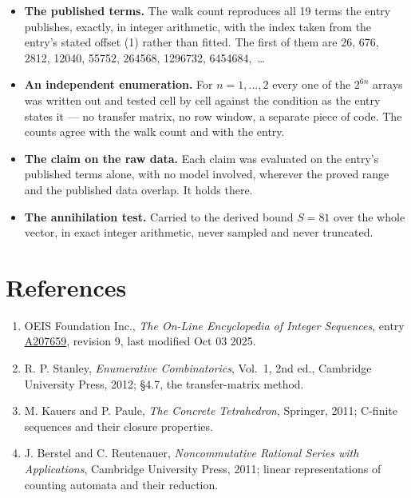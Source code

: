 \documentclass[11pt]{article}
\theoremstyle{definition}
\begin{document}
\begin{itemize}

\item {\bfseries The published terms.} The walk count reproduces all 19 terms the entry publishes, exactly, in integer arithmetic, with the index taken from the entry's stated offset (1) rather than fitted. The first of them are 26, 676, 2812, 12040, 55752, 264568, 1296732, 6454684,~\dots

\item {\bfseries An independent enumeration.} For $n = 1,\dots,2$ every one of the $2^{6n}$ arrays was written out and tested cell by cell against the condition as the entry states it --- no transfer matrix, no row window, a separate piece of code. The counts agree with the walk count and with the entry.

\item {\bfseries The claim on the raw data.} Each claim was evaluated on the entry's published terms alone, with no model involved, wherever the proved range and the published data overlap. It holds there.

\item {\bfseries The annihilation test.} Carried to the derived bound $S = 81$ over the whole vector, in exact integer arithmetic, never sampled and never truncated.

\end{itemize}

\section{References}

\begin{enumerate}

\item OEIS Foundation Inc., \emph{The On-Line Encyclopedia of Integer Sequences}, entry \href{https://oeis.org/A207659}{A207659}, revision 9, last modified Oct 03 2025.

\item R. P. Stanley, \emph{Enumerative Combinatorics}, Vol.~1, 2nd ed., Cambridge University Press, 2012; \S4.7, the transfer-matrix method.

\item M. Kauers and P. Paule, \emph{The Concrete Tetrahedron}, Springer, 2011; C-finite sequences and their closure properties.

\item J. Berstel and C. Reutenauer, \emph{Noncommutative Rational Series with Applications}, Cambridge University Press, 2011; linear representations of counting automata and their reduction.

\end{enumerate}
\end{document}
